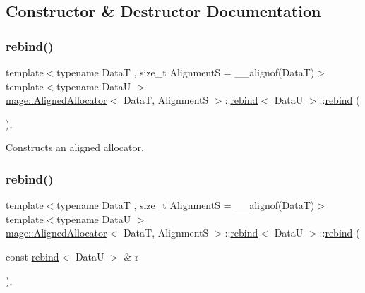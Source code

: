 \subsection{Constructor \& Destructor Documentation}
\hypertarget{structmage_1_1_aligned_allocator_1_1rebind_a2b26e5afbed6b26f73ed0186c2ff52d6}{}\label{structmage_1_1_aligned_allocator_1_1rebind_a2b26e5afbed6b26f73ed0186c2ff52d6} 
\subsubsection{\texorpdfstring{rebind()}{rebind()}\hspace{0.1cm}{\footnotesize\ttfamily [1/3]}}
{\footnotesize\ttfamily template$<$typename DataT , size\+\_\+t AlignmentS = \+\_\+\+\_\+alignof(\+Data\+T)$>$ \\
template$<$typename DataU $>$ \\
\hyperlink{structmage_1_1_aligned_allocator}{mage\+::\+Aligned\+Allocator}$<$ DataT, AlignmentS $>$\+::\hyperlink{structmage_1_1_aligned_allocator_1_1rebind}{rebind}$<$ DataU $>$\+::\hyperlink{structmage_1_1_aligned_allocator_1_1rebind}{rebind} (\begin{DoxyParamCaption}{ }\end{DoxyParamCaption})\hspace{0.3cm}{\ttfamily [private]}, {\ttfamily [delete]}}

Constructs an aligned allocator. \hypertarget{structmage_1_1_aligned_allocator_1_1rebind_a3ec1fb665819e0061c26e2366861f64a}{}\label{structmage_1_1_aligned_allocator_1_1rebind_a3ec1fb665819e0061c26e2366861f64a} 
\subsubsection{\texorpdfstring{rebind()}{rebind()}\hspace{0.1cm}{\footnotesize\ttfamily [2/3]}}
{\footnotesize\ttfamily template$<$typename DataT , size\+\_\+t AlignmentS = \+\_\+\+\_\+alignof(\+Data\+T)$>$ \\
template$<$typename DataU $>$ \\
\hyperlink{structmage_1_1_aligned_allocator}{mage\+::\+Aligned\+Allocator}$<$ DataT, AlignmentS $>$\+::\hyperlink{structmage_1_1_aligned_allocator_1_1rebind}{rebind}$<$ DataU $>$\+::\hyperlink{structmage_1_1_aligned_allocator_1_1rebind}{rebind} (\begin{DoxyParamCaption}\item[{const \hyperlink{structmage_1_1_aligned_allocator_1_1rebind}{rebind}$<$ DataU $>$ \&}]{r }\end{DoxyParamCaption})\hspace{0.3cm}{\ttfamily [private]}, {\ttfamily [delete]}}

